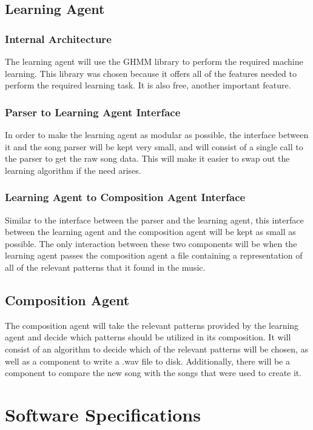 \documentclass{article}
\begin{document}
\subsection{Learning Agent}
\subsubsection{Internal Architecture}
The learning agent will use the GHMM library \cite{GHMM} to perform the required machine learning. This library was chosen because it offers all of the features needed to perform the required learning task. It is also free, another important feature.

\subsubsection{Parser to Learning Agent Interface}
In order to make the learning agent as modular as possible, the interface between it and the song parser will be kept very small, and will consist of a single call to the parser to get the raw song data. This will make it easier to swap out the learning algorithm if the need arises.

\subsubsection{Learning Agent to Composition Agent Interface}
Similar to the interface between the parser and the learning agent, this interface between the learning agent and the composition agent will be kept as small as possible. The only interaction between these two components will be when the learning agent passes the composition agent a file containing a representation of all of the relevant patterns that it found in the music.

\subsection{Composition Agent}
The composition agent will take the relevant patterns provided by the learning agent and decide which patterns should be utilized in its composition. It will consist of an algorithm to decide which of the relevant patterns will be chosen, as well as a component to write a .wav file to disk.  Additionally, there will be a component to compare the new song with the songs that were used to create it.

\section{Software Specifications}
\end{document}
